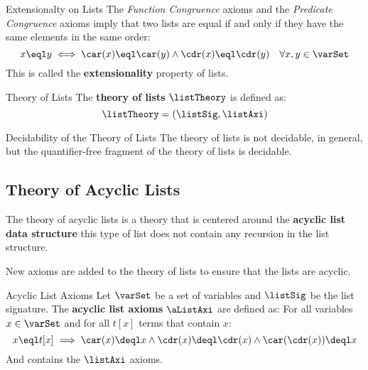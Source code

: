 \begin{remark}{Extensionalty on Lists}
    The \textit{Function Congruence} axioms and the \textit{Predicate Congruence}
    axioms imply that two lists are equal if and only if they have the same
    elements in the same order:
    \begin{equation*}
        x \eql y \iff \car(x) \eql \car(y) \land \cdr(x) \eql \cdr(y)
        \quad \forall x,y \in \varSet
    \end{equation*}
    This is called the \textbf{extensionality} property of lists.
\end{remark}

\begin{definition}{Theory of Lists}
    The \textbf{theory of lists} $\listTheory$ is defined as:
    \begin{equation*}
        \listTheory = (\listSig,\listAxi)
    \end{equation*}
\end{definition}

\begin{remark}{Decidability of the Theory of Lists}
    The theory of lists is not decidable, in general,
    but the quantifier-free fragment of the theory of lists is decidable.
\end{remark}

\subsection{Theory of Acyclic Lists}
\label{subsec:Theory of Acyclic Lists}

The theory of acyclic lists is a theory that is centered around the
\textbf{acyclic list data structure} this type of list does not contain
any recursion in the list structure.

New axioms are added to the theory of lists to ensure that the lists
are acyclic.

\begin{definition}{Acyclic List Axioms}
    Let $\varSet$ be a set of variables and $\listSig$ be the list signature.
    The \textbf{acyclic list axioms} $\aListAxi$ are defined as:
    For all variables $x \in \varSet$ and for all $t[x]$ terms 
    that contain $x$:
    \begin{equation*}
        x \eql t[x] \implies \car(x) \deql x \land \cdr(x) \deql \cdr(x) \land
        \car(\cdr(x)) \deql x
    \end{equation*}
    And contains the $\listAxi$ axioms.
\end{definition}

